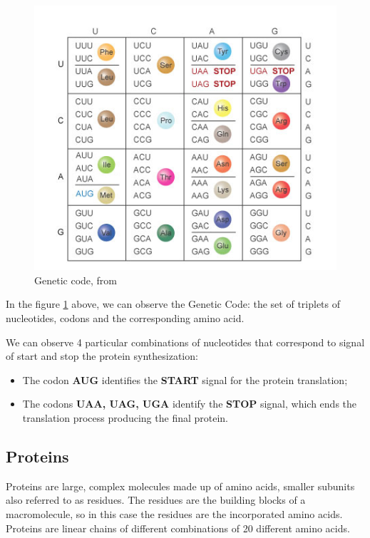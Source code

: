 \begin{figure}[h!]
	\includegraphics[scale=1.3]{res/proteins_overview/genetic_code.png}
	\centering
	\caption{Genetic code, from \cite{geneticcode}}
	\label{fig:genetic-code}
\end{figure}

In the figure \ref{fig:genetic-code} above, we can observe the Genetic Code: the set of triplets of nucleotides, codons and the corresponding amino acid.

We can observe 4 particular combinations of nucleotides that correspond to signal of start and stop the protein synthesization:
\begin{itemize}
	\item The codon \textbf{AUG} identifies the \textbf{START} signal for the protein translation;
	\item The codons \textbf{UAA, UAG, UGA} identify the \textbf{STOP} signal, which ends the translation process producing the final protein.
\end{itemize}
\vspace{5em}
\subsection{Proteins}
Proteins are large, complex molecules made up of amino acids, smaller subunits also referred to as residues. The residues are the building blocks of a macromolecule, so in this case the residues are the incorporated amino acids.
Proteins are linear chains of different combinations of 20 different amino acids. 

